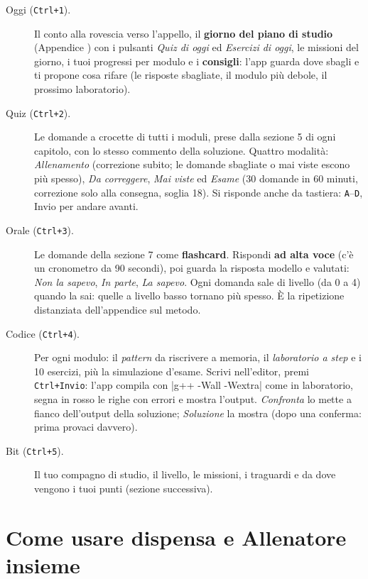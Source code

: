 \begin{description}
  \item[Oggi (\texttt{Ctrl+1}).] Il conto alla rovescia verso l'appello, il
        \textbf{giorno del piano di studio} (Appendice ) con i pulsanti
        \emph{Quiz di oggi} ed \emph{Esercizi di oggi}, le missioni del giorno, i tuoi
        progressi per modulo e i \textbf{consigli}: l'app guarda dove sbagli e ti propone
        cosa rifare (le risposte sbagliate, il modulo più debole, il prossimo
        laboratorio).
  \item[Quiz (\texttt{Ctrl+2}).] Le domande a crocette di tutti i moduli, prese dalla
        sezione 5 di ogni capitolo, con lo stesso commento della soluzione. Quattro
        modalità: \emph{Allenamento} (correzione subito; le domande sbagliate o mai viste
        escono più spesso), \emph{Da correggere}, \emph{Mai viste} ed \emph{Esame}
        (30 domande in 60 minuti, correzione solo alla consegna, soglia 18). Si risponde
        anche da tastiera: \texttt{A}--\texttt{D}, Invio per andare avanti.
  \item[Orale (\texttt{Ctrl+3}).] Le domande della sezione 7 come \textbf{flashcard}.
        Rispondi \textbf{ad alta voce} (c'è un cronometro da 90 secondi), poi guarda la
        risposta modello e valutati: \emph{Non la sapevo}, \emph{In parte}, \emph{La
        sapevo}. Ogni domanda sale di livello (da 0 a 4) quando la sai: quelle a livello
        basso tornano più spesso. È la ripetizione distanziata dell'appendice sul metodo.
  \item[Codice (\texttt{Ctrl+4}).] Per ogni modulo: il \emph{pattern} da riscrivere a
        memoria, il \emph{laboratorio a step} e i 10 esercizi, più la simulazione
        d'esame. Scrivi nell'editor, premi \texttt{Ctrl+Invio}: l'app compila con
        \cc|g++ -Wall -Wextra| come in laboratorio, segna in rosso le righe con errori e
        mostra l'output. \emph{Confronta} lo mette a fianco dell'output della soluzione;
        \emph{Soluzione} la mostra (dopo una conferma: prima provaci davvero).
  \item[Bit (\texttt{Ctrl+5}).] Il tuo compagno di studio, il livello, le missioni, i
        traguardi e da dove vengono i tuoi punti (sezione successiva).
\end{description}

\section*{Come usare dispensa e Allenatore insieme}

